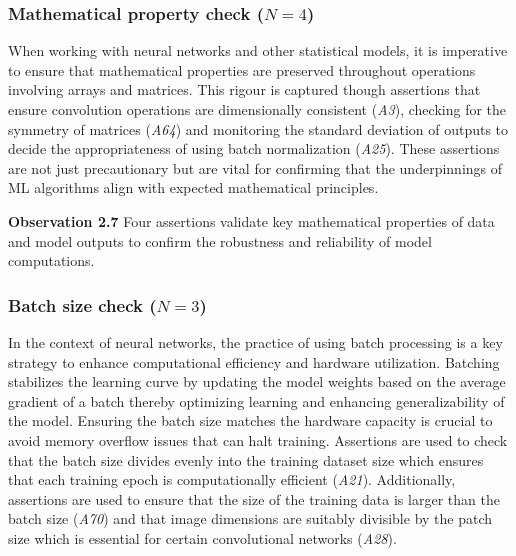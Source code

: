 \documentclass[smallextended]{svjour3}       %
\newcommand{\highlight}[1]{\begin{framed}%
  \noindent#1
\end{framed}}
\providecommand{\DIFaddbegin}{} %
\providecommand{\DIFaddend}{} %
\providecommand{\DIFdelbegin}{} %
\providecommand{\DIFdelend}{} %
\newcommand{\DIFscaledelfig}{0.5}
\newlength{\DIFdelgraphicswidth} %
\newlength{\DIFdelgraphicsheight} %
\newcommand{\DIFaddincludegraphics}[2][]{{\color{blue}\fbox{\DIFOincludegraphics[#1]{#2}}}} %
\newcommand{\DIFdelincludegraphics}[2][]{%
\sbox{\DIFdelgraphicsbox}{\DIFOincludegraphics[#1]{#2}}%
\settoboxwidth{\DIFdelgraphicswidth}{\DIFdelgraphicsbox} %
\settoboxtotalheight{\DIFdelgraphicsheight}{\DIFdelgraphicsbox} %
\scalebox{\DIFscaledelfig}{%
\parbox[b]{\DIFdelgraphicswidth}{\usebox{\DIFdelgraphicsbox}\\[-\baselineskip] \rule{\DIFdelgraphicswidth}{0em}}\llap{\resizebox{\DIFdelgraphicswidth}{\DIFdelgraphicsheight}{%
\setlength{\unitlength}{\DIFdelgraphicswidth}%
\begin{picture}(1,1)%
\thicklines\linethickness{2pt} %
{\color[rgb]{1,0,0}\put(0,0){\framebox(1,1){}}}%
{\color[rgb]{1,0,0}\put(0,0){\line( 1,1){1}}}%
{\color[rgb]{1,0,0}\put(0,1){\line(1,-1){1}}}%
\end{picture}%
}\hspace*{3pt}}} %
} %
\DeclareRobustCommand{\DIFaddbegin}{\DIFOaddbegin \let\includegraphics\DIFaddincludegraphics} %
\DeclareRobustCommand{\DIFaddend}{\DIFOaddend \let\includegraphics\DIFOincludegraphics} %
\DeclareRobustCommand{\DIFdelbegin}{\DIFOdelbegin \let\includegraphics\DIFdelincludegraphics} %
\DeclareRobustCommand{\DIFdelend}{\DIFOaddend \let\includegraphics\DIFOincludegraphics} %
\begin{document}
\subsubsection{Mathematical property check ($N = 4$)}

When working with neural networks and other statistical models, it is imperative to ensure that mathematical properties are preserved throughout operations involving arrays and matrices. This rigour is captured though assertions that ensure convolution operations are dimensionally consistent (\emph{A3}), checking for the symmetry of matrices (\emph{A64}) and monitoring the standard deviation of outputs to decide the appropriateness of using batch normalization (\emph{A25}). These assertions are not just precautionary but are vital for confirming that the underpinnings of ML algorithms align with expected mathematical principles.

\DIFdelbegin %
\DIFdelend \DIFaddbegin \highlight{\textbf{Observation 2.7} Four assertions validate key mathematical properties of data and model outputs to confirm the robustness and reliability of model computations.}
\DIFaddend 

\subsubsection{Batch size check ($N = 3$)}

In the context of neural networks, the practice of using batch processing is a key strategy to enhance computational efficiency and hardware utilization. Batching stabilizes the learning curve by updating the model weights based on the average gradient of a batch thereby optimizing learning and enhancing generalizability of the model. Ensuring the batch size matches the hardware capacity is crucial to avoid memory overflow issues that can halt training. Assertions are used to check that the batch size divides evenly into the training dataset size which ensures that each training epoch is computationally efficient (\emph{A21}). Additionally, assertions are used to ensure that the size of the training data is larger than the batch size (\emph{A70}) and that image dimensions are suitably divisible by the patch size which is essential for certain convolutional networks (\emph{A28}).
\end{document}
